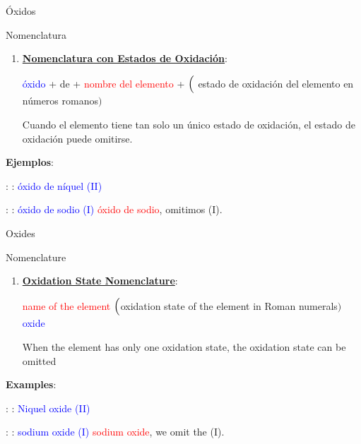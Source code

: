 \documentclass{beamer}
\newcommand*{\numberballmDarkTeal}{\protect\cnumero{\arabic*}{mDarkTeal}}
\begin{document}


\begin{frame}[t]{Óxidos}
    \begin{alertblock}{\Large Nomenclatura}

        \begin{enumerate}[start=2,label=\numberballmDarkTeal]
            \item \textbf{\uline{Nomenclatura con Estados de Oxidación}}:
                  \begin{center}
                      \textcolor{blue}{óxido} + de + \textcolor{red}{nombre del elemento} + $\Bigl($ \textcolor{green!50!black}{estado de oxidación del elemento en números romanos}$\Bigr)$
                  \end{center}
                  Cuando el elemento tiene tan solo un único estado de oxidación, el estado de oxidación puede omitirse.
        \end{enumerate}

        \textbf{Ejemplos}:

         : : \textcolor{blue}{óxido de níquel (II)}

         : : \textcolor{blue}{óxido de sodio (I)} \ch{->} \textcolor{red}{óxido de sodio}, omitimos (I).
    \end{alertblock}
\end{frame}

\begin{frame}[t]{ Oxides}
    \begin{alertblock}{\Large Nomenclature} 

        \begin{enumerate}[start=2,label=\numberballmDarkTeal]
            \item \textbf{\uline{Oxidation State Nomenclature}}:
                  \begin{center}
                    \textcolor{red}{name of the element} $\Bigl($\textcolor{green!50!black}{oxidation state of the element in Roman numerals}$\Bigr)$ \textcolor{blue}{oxide} 
                  \end{center}
                  When the element has only one oxidation state, the oxidation state can be omitted
        \end{enumerate}

        \textbf{Examples}:

         : : \textcolor{blue}{Niquel oxide (II)}

         : : \textcolor{blue}{sodium oxide (I)} \ch{->} \textcolor{red}{sodium oxide}, we omit the (I).
    \end{alertblock}
\end{frame}
\end{document}
